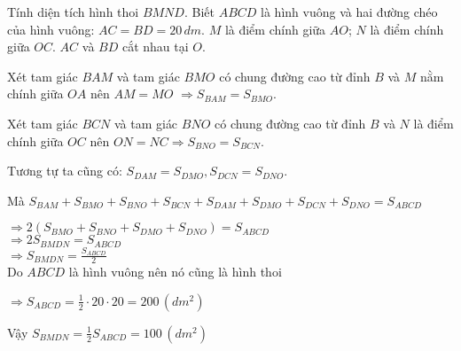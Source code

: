 \begin{bt}
	Tính diện tích hình thoi $BMND$. Biết $ABCD$ là hình vuông và hai đường chéo của hình vuông:  $AC=BD=20 \,dm$. $M$ là điểm chính giữa $AO$; $N$ là điểm chính giữa $OC$. $AC$ và $BD$ cắt nhau tại $O$.
	\begin{loigiaichuong37}
		Xét tam giác $BAM$ và tam giác $BMO$ có chung đường cao từ đỉnh $B$ và $M$ nằm chính giữa $OA$ nên  $AM=MO$  $\Rightarrow {{S}_{BAM}}={{S}_{BMO}}$.
		
		Xét tam giác $BCN$ và tam giác $BNO$ có chung đường cao từ đỉnh $B$ và $N$ là điểm chính giữa $OC$ nên  $ON=NC\Rightarrow {{S}_{BNO}}={{S}_{BCN}}$.
		 
		Tương tự ta cũng có:  ${{S}_{DAM}}={{S}_{DMO}},{{S}_{DCN}}={{S}_{DNO}}$.
		 
		Mà  ${{S}_{BAM}}+{{S}_{BMO}}+{{S}_{BNO}}+{{S}_{BCN}}+{{S}_{DAM}}+{{S}_{DMO}}+{{S}_{DCN}}+{{S}_{DNO}}={{S}_{ABCD}}$ 
		
		$\Rightarrow 2({{S}_{BMO}}+{{S}_{BNO}}+{{S}_{DMO}}+{{S}_{DNO}})={{S}_{ABCD}}$\\ 
		$\Rightarrow 2{{S}_{BMDN}}={{S}_{ABCD}}$ \\ 
		$\Rightarrow {{S}_{BMDN}}=\frac{{{S}_{ABCD}}}{2}$\\ 
		
		Do $ABCD$ là hình vuông nên nó cũng là hình thoi
		
		$\Rightarrow {{S}_{ABCD}}=\frac{1}{2}\cdot20\cdot20=200\,(dm^2)$
		 
		Vậy  ${{S}_{BMDN}}=\frac{1}{2}{{S}_{ABCD}}=100\,(dm^2)$ 
	\end{loigiaichuong37}
\end{bt}
